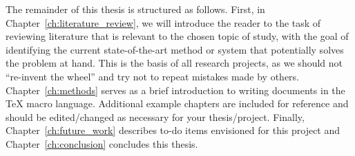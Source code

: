 The remainder of this thesis is structured as follows. First, in Chapter~\ref{ch:literature_review}, we will introduce the reader to the task of reviewing literature that is relevant to the chosen topic of study, with the goal of identifying the current state-of-the-art method or system that potentially solves the problem at hand. This is the basis of all research projects, as we should not ``re-invent the wheel'' and try not to repeat mistakes made by others. Chapter~\ref{ch:methods} serves as a brief introduction to writing documents in the TeX macro language. Additional example chapters are included for reference and should be edited/changed as necessary for your thesis/project. Finally, Chapter~\ref{ch:future_work} describes to-do items envisioned for this project and Chapter~\ref{ch:conclusion} concludes this thesis.